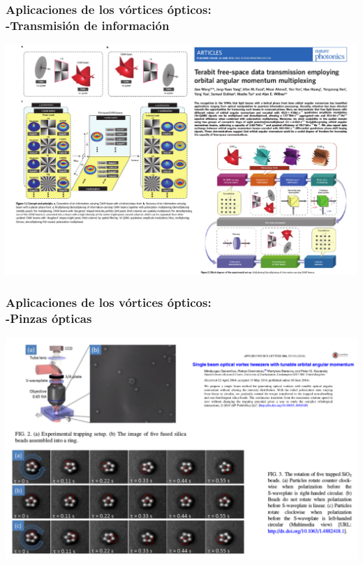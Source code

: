 \documentclass[serif,8pt]{beamer}
\begin{document}
		\begin{frame}
		\frametitle{Aplicaciones de los vórtices ópticos:\\ -Transmisión de información}
				\centering
				\includegraphics[scale=0.5]{img/Transmision.pdf}
		\end{frame}
		
		\begin{frame}
		\frametitle{Aplicaciones de los vórtices ópticos:\\ -Pinzas ópticas}
				\centering
				\includegraphics[scale=0.5]{img/tweezers.pdf}
		\end{frame}
		
\end{document}

